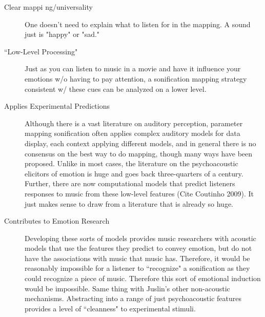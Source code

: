 \begin{description}
\item[Clear mappi	ng/universality] One doesn't need to explain what to listen for in the mapping.  A sound just is "happy" or "sad."
\item[``Low-Level Processing"] Just as you can listen to music in a movie and have it influence your emotions w/o having to pay attention, a sonification mapping strategy consistent w/ these cues can be analyzed on a lower level.
\item[Applies Experimental Predictions] Although there is a vast literature on auditory perception, parameter mapping sonification often applies complex auditory models for data display, each context applying different models, and in general there is no consensus on the best way to do mapping, though many ways have been proposed.  Unlike in most cases, the literature on the psychoacoustic elicitors of emotion is huge and goes back three-quarters of a century.  Further, there are now computational models that predict listeners responses to music from these low-level features (Cite Coutinho 2009).  It just makes sense to draw from a literature that is already so huge.
\item[Contributes to Emotion Research]  Developing these sorts of models provides music researchers with acoustic models that use the features they predict to convey emotion, but do not have the associations with music that music has.  Therefore, it would be reasonably impossible for a listener to ``recognize" a sonification as they could recognize a piece of music.  Therefore this sort of emotional induction would be impossible.  Same thing with Juslin's other non-acoustic mechanisms.  Abstracting into a range of just psychoacoustic features provides a level of ``cleanness" to experimental stimuli.    


\end{description}







































